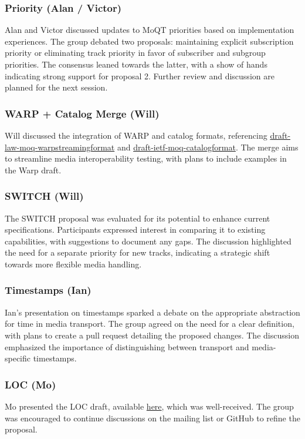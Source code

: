 \documentclass{article}
\begin{document}
\subsubsection{Priority (Alan / Victor)}
Alan and Victor discussed updates to MoQT priorities based on implementation experiences. The group debated two proposals: maintaining explicit subscription priority or eliminating track priority in favor of subscriber and subgroup priorities. The consensus leaned towards the latter, with a show of hands indicating strong support for proposal 2. Further review and discussion are planned for the next session.

\subsubsection{WARP + Catalog Merge (Will)}
Will discussed the integration of WARP and catalog formats, referencing \href{https://datatracker.ietf.org/doc/html/draft-law-moq-warpstreamingformat}{draft-law-moq-warpstreamingformat} and \href{https://datatracker.ietf.org/doc/html/draft-ietf-moq-catalogformat}{draft-ietf-moq-catalogformat}. The merge aims to streamline media interoperability testing, with plans to include examples in the Warp draft.

\subsubsection{SWITCH (Will)}
The SWITCH proposal was evaluated for its potential to enhance current specifications. Participants expressed interest in comparing it to existing capabilities, with suggestions to document any gaps. The discussion highlighted the need for a separate priority for new tracks, indicating a strategic shift towards more flexible media handling.

\subsubsection{Timestamps (Ian)}
Ian's presentation on timestamps sparked a debate on the appropriate abstraction for time in media transport. The group agreed on the need for a clear definition, with plans to create a pull request detailing the proposed changes. The discussion emphasized the importance of distinguishing between transport and media-specific timestamps.

\subsubsection{LOC (Mo)}
Mo presented the LOC draft, available \href{https://datatracker.ietf.org/doc/draft-mzanaty-moq-loc/}{here}, which was well-received. The group was encouraged to continue discussions on the mailing list or GitHub to refine the proposal.
\end{document}
